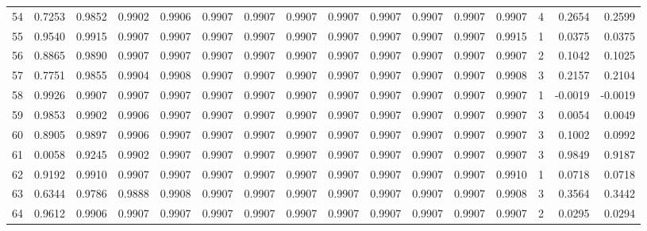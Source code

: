 \begin{tabular}{lrrrrrrrrrrrrrrr}
54  &      0.7253 &  0.9852 &  0.9902 &  0.9906 &  0.9907 &  0.9907 &  0.9907 &  0.9907 &  0.9907 &  0.9907 &   0.9907 &     0.9907 &      4 &                    0.2654 &                     0.2599 \\
55  &      0.9540 &  0.9915 &  0.9907 &  0.9907 &  0.9907 &  0.9907 &  0.9907 &  0.9907 &  0.9907 &  0.9907 &   0.9907 &     0.9915 &      1 &                    0.0375 &                     0.0375 \\
56  &      0.8865 &  0.9890 &  0.9907 &  0.9907 &  0.9907 &  0.9907 &  0.9907 &  0.9907 &  0.9907 &  0.9907 &   0.9907 &     0.9907 &      2 &                    0.1042 &                     0.1025 \\
57  &      0.7751 &  0.9855 &  0.9904 &  0.9908 &  0.9907 &  0.9907 &  0.9907 &  0.9907 &  0.9907 &  0.9907 &   0.9907 &     0.9908 &      3 &                    0.2157 &                     0.2104 \\
58  &      0.9926 &  0.9907 &  0.9907 &  0.9907 &  0.9907 &  0.9907 &  0.9907 &  0.9907 &  0.9907 &  0.9907 &   0.9907 &     0.9907 &      1 &                   -0.0019 &                    -0.0019 \\
59  &      0.9853 &  0.9902 &  0.9906 &  0.9907 &  0.9907 &  0.9907 &  0.9907 &  0.9907 &  0.9907 &  0.9907 &   0.9907 &     0.9907 &      3 &                    0.0054 &                     0.0049 \\
60  &      0.8905 &  0.9897 &  0.9906 &  0.9907 &  0.9907 &  0.9907 &  0.9907 &  0.9907 &  0.9907 &  0.9907 &   0.9907 &     0.9907 &      3 &                    0.1002 &                     0.0992 \\
61  &      0.0058 &  0.9245 &  0.9902 &  0.9907 &  0.9907 &  0.9907 &  0.9907 &  0.9907 &  0.9907 &  0.9907 &   0.9907 &     0.9907 &      3 &                    0.9849 &                     0.9187 \\
62  &      0.9192 &  0.9910 &  0.9907 &  0.9907 &  0.9907 &  0.9907 &  0.9907 &  0.9907 &  0.9907 &  0.9907 &   0.9907 &     0.9910 &      1 &                    0.0718 &                     0.0718 \\
63  &      0.6344 &  0.9786 &  0.9888 &  0.9908 &  0.9907 &  0.9907 &  0.9907 &  0.9907 &  0.9907 &  0.9907 &   0.9907 &     0.9908 &      3 &                    0.3564 &                     0.3442 \\
64  &      0.9612 &  0.9906 &  0.9907 &  0.9907 &  0.9907 &  0.9907 &  0.9907 &  0.9907 &  0.9907 &  0.9907 &   0.9907 &     0.9907 &      2 &                    0.0295 &                     0.0294 \\

\end{tabular}
